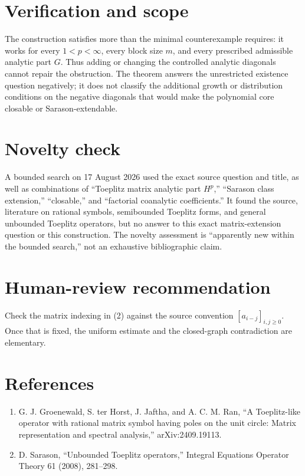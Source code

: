 \documentclass[11pt]{article}
\begin{document}
\section*{Verification and scope}

The construction satisfies more than the minimal counterexample requires:
it works for every $1<p<\infty$, every block size $m$, and every prescribed
admissible analytic part $G$.  Thus adding or changing the controlled
analytic diagonals cannot repair the obstruction.  The theorem answers the
unrestricted existence question negatively; it does not classify the
additional growth or distribution conditions on the negative diagonals that
would make the polynomial core closable or Sarason-extendable.

\section*{Novelty check}

A bounded search on 17 August 2026 used the exact source question and title,
as well as combinations of ``Toeplitz matrix analytic part $H^p$,''
``Sarason class extension,'' ``closable,'' and ``factorial coanalytic
coefficients.''  It found the source, literature on rational symbols,
semibounded Toeplitz forms, and general unbounded Toeplitz operators, but no
answer to this exact matrix-extension question or this construction.  The
novelty assessment is ``apparently new within the bounded search,'' not an
exhaustive bibliographic claim.

\section*{Human-review recommendation}

Check the matrix indexing in (2) against the source convention
$[a_{i-j}]_{i,j\ge0}$.  Once that is fixed, the uniform estimate and the
closed-graph contradiction are elementary.

\section*{References}

\begin{enumerate}
\item G. J. Groenewald, S. ter Horst, J. Jaftha, and A. C. M. Ran,
  ``A Toeplitz-like operator with rational matrix symbol having poles on the
  unit circle: Matrix representation and spectral analysis,''
  arXiv:2409.19113.
\item D. Sarason, ``Unbounded Toeplitz operators,'' Integral Equations
  Operator Theory 61 (2008), 281--298.
\end{enumerate}
\end{document}
